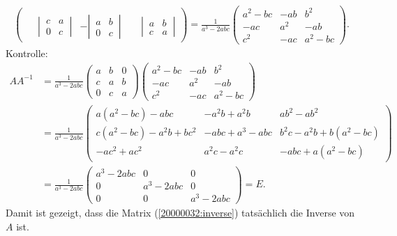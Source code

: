 \begin{loesung}
\begin{align}
\begin{pmatrix}
			\\[13pt]
\phantom{-}\left|\,\begin{matrix}c&a\\0&c\end{matrix}\,\right|
	&-\left|\,\begin{matrix}a&b\\0&c\end{matrix}\,\right|
		&\phantom{-}\left|\,\begin{matrix}a&b\\c&a\end{matrix}\,\right|
\end{pmatrix}
=
\frac1{a^3-2abc}\begin{pmatrix}
a^2-bc&-ab&b^2\\
-ac&a^2&-ab\\
c^2&-ac&a^2-bc
\end{pmatrix}.
\label{20000032:inverse}
\end{align}
Kontrolle:
\begin{align*}
AA^{-1}
&=
\frac1{a^3-2abc}
\begin{pmatrix}
a&b&0\\
c&a&b\\
0&c&a
\end{pmatrix}
\begin{pmatrix}
a^2-bc&-ab&b^2\\
-ac&a^2&-ab\\
c^2&-ac&a^2-bc
\end{pmatrix}
\\
&=
\frac1{a^3-2abc}
\begin{pmatrix}
a(a^2-bc)-abc      &-a^2b+a^2b  &ab^2-ab^2          \\
c(a^2-bc)-a^2b+bc^2&-abc+a^3-abc&b^2c-a^2b+b(a^2-bc)\\
-ac^2+ac^2         &a^2c-a^2c   &-abc+a(a^2-bc)
\end{pmatrix}
\\
&=
\frac1{a^3-2abc}
\begin{pmatrix}
a^3-2abc&0&0\\
0&a^3-2abc&0\\
0&0&a^3-2abc
\end{pmatrix}
=E.
\end{align*}
Damit ist gezeigt, dass die Matrix (\ref{20000032:inverse}) tatsächlich
die Inverse von $A$ ist.
\end{loesung}

